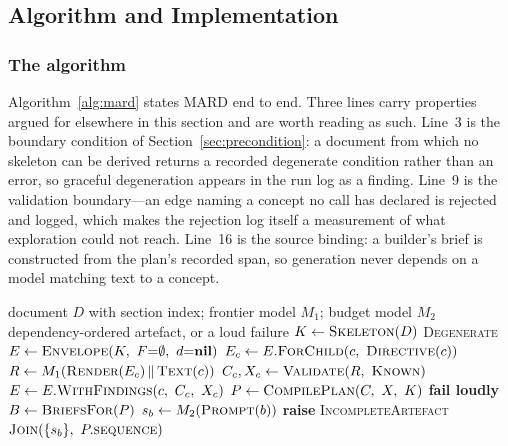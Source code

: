 \documentclass[conference]{IEEEtran}
\begin{document}
\subsection{Algorithm and Implementation}
\label{sec:impl}
\label{sec:setup}

\subsubsection{The algorithm}
Algorithm~\ref{alg:mard} states MARD end to end. Three lines carry properties
argued for elsewhere in this section and are worth reading as such. Line~3 is
the boundary condition of Section~\ref{sec:precondition}: a document from
which no skeleton can be derived returns a recorded degenerate condition
rather than an error, so graceful degeneration appears in the run log as a
finding. Line~9 is the validation boundary---an edge naming a concept no call
has declared is rejected and logged, which makes the rejection log itself a
measurement of what exploration could not reach. Line~16 is the source
binding: a builder's brief is constructed from the plan's recorded span, so
generation never depends on a model matching text to a concept.

\begin{algorithm}[!t]
\caption{MARD (two-pass configuration)}
\label{alg:mard}
\begin{algorithmic}[1]
\REQUIRE document $D$ with section index; frontier model $M_1$; budget model $M_2$
\ENSURE dependency-ordered artefact, or a loud failure
\STATE $K \leftarrow \textsc{Skeleton}(D)$ 
  \RETURN \textsc{Degenerate} 
\ENDIF
\STATE $E \leftarrow \textsc{Envelope}(K,\ F {=} \emptyset,\ d {=} \textbf{nil})$
  \STATE $E_c \leftarrow E.\textsc{ForChild}(c,\ \textsc{Directive}(c))$
  \STATE $R \leftarrow M_1(\textsc{Render}(E_c) \,\Vert\, \textsc{Text}(c))$ 
  \STATE $C_c, X_c \leftarrow \textsc{Validate}(R,\ \textsc{Known})$ 
  \STATE $E \leftarrow E.\textsc{WithFindings}(c,\ C_c,\ X_c)$ 
\ENDFOR
\STATE $P \leftarrow \textsc{CompilePlan}(C,\ X,\ K)$ 
  \STATE \textbf{fail loudly} 
\ENDIF
\STATE $B \leftarrow \textsc{BriefsFor}(P)$ 
  \STATE $s_b \leftarrow M_2(\textsc{Prompt}(b))$ 
\ENDFOR
{}
  \STATE \textbf{raise} \textsc{IncompleteArtefact}
\ENDIF
\RETURN $\textsc{Join}(\{s_b\},\ P.\textsc{sequence})$ 
\end{algorithmic}
\end{algorithm}
\end{document}
